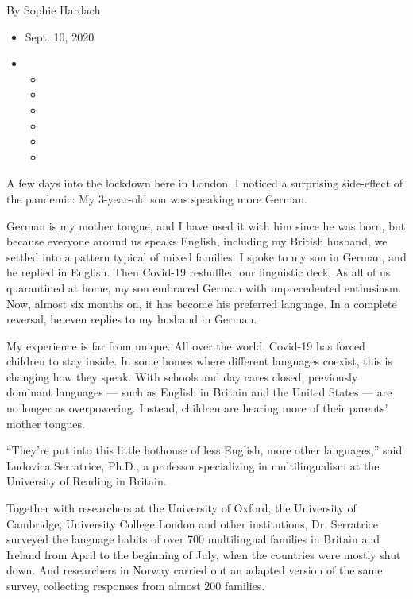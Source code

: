 By Sophie Hardach

\begin{itemize}
\item
  Sept. 10, 2020
\item
  \begin{itemize}
  \item
  \item
  \item
  \item
  \item
  \item
  \end{itemize}
\end{itemize}

A few days into the lockdown here in London, I noticed a surprising
side-effect of the pandemic: My 3-year-old son was speaking more German.

German is my mother tongue, and I have used it with him since he was
born, but because everyone around us speaks English, including my
British husband, we settled into a pattern typical of mixed families. I
spoke to my son in German, and he replied in English. Then Covid-19
reshuffled our linguistic deck. As all of us quarantined at home, my son
embraced German with unprecedented enthusiasm. Now, almost six months
on, it has become his preferred language. In a complete reversal, he
even replies to my husband in German.

My experience is far from unique. All over the world, Covid-19 has
forced children to stay inside. In some homes where different languages
coexist, this is changing how they speak. With schools and day cares
closed, previously dominant languages --- such as English in Britain and
the United States --- are no longer as overpowering. Instead, children
are hearing more of their parents' mother tongues.

``They're put into this little hothouse of less English, more other
languages,'' said Ludovica Serratrice, Ph.D., a professor specializing
in multilingualism at the University of Reading in Britain.

Together with researchers at the University of Oxford, the University of
Cambridge, University College London and other institutions, Dr.
Serratrice surveyed the language habits of over 700 multilingual
families in Britain and Ireland from April to the beginning of July,
when the countries were mostly shut down. And researchers in Norway
carried out an adapted version of the same survey, collecting responses
from almost 200 families.


